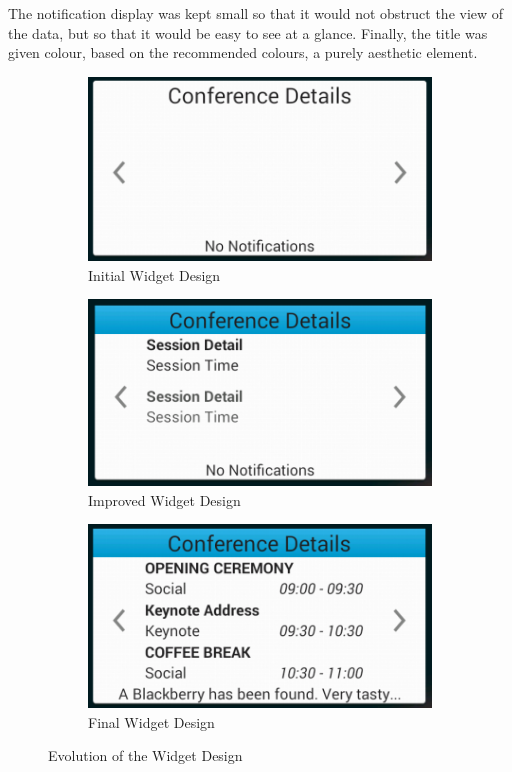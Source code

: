\documentclass[11pt, a4paper]{article}
\begin{document}
The notification display was kept small so that it would not obstruct the view
of the data, but so that it would be easy to see at a glance. Finally, the 
title was given colour, based on the recommended 
colours\cite{google2013colour}, a purely aesthetic element.

\begin{figure}[h]
\centering
\begin{subfigure}[h]{0.3\textwidth}
\includegraphics[width=\textwidth]{img/design_initial}
\caption{Initial Widget Design}
\end{subfigure}
\begin{subfigure}[h]{0.3\textwidth}
\includegraphics[width=\textwidth]{img/design_second}
\caption{Improved Widget Design}
\end{subfigure}
\begin{subfigure}[h]{0.3\textwidth}
\includegraphics[width=\textwidth]{img/design_final}
\caption{Final Widget Design}
\end{subfigure}

\caption{Evolution of the Widget Design}
\label{fig:widget_design}
\end{figure}
\end{document}
